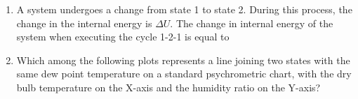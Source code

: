 \documentclass[a4paper,10pt]{article}
\begin{document}
\begin{enumerate}
    \item A system undergoes a change from state 1 to state 2. During this process, the change in the internal energy is $\Delta U$. The change in internal energy of the system when executing the cycle 1-2-1 is equal to
    
    \hfill{}
    \begin{enumerate}[label=\Alph*)]
    \end{enumerate}

    \item Which among the following plots represents a line joining two states with the same dew point temperature on a standard psychrometric chart, with the dry bulb temperature on the X-axis and the humidity ratio on the Y-axis?
    

\end{enumerate}
\end{document}
